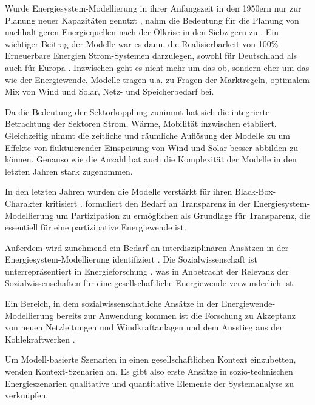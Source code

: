\documentclass[a4paper,11pt,twoside]{scrartcl}
\begin{document}
Wurde Energiesystem-Modellierung in ihrer Anfangszeit in den 1950ern nur zur Planung neuer Kapazitäten genutzt \cite{Kagiannas2004}, nahm die Bedeutung für die Planung von nachhaltigeren Energiequellen nach der Ölkrise in den Siebzigern zu \cite{Wei2006}. Ein wichtiger Beitrag der Modelle war es dann, die Realisierbarkeit von 100\% Erneuerbare Energien Strom-Systemen darzulegen, sowohl für Deutschland \cite{SRU2011} als auch für Europa \cite{Hohmeyer2015}. Inzwischen geht es nicht mehr um das ob, sondern eher um das wie der Energiewende. Modelle tragen u.a. zu Fragen der Marktregeln, optimalem Mix von Wind und Solar, Netz- und Speicherbedarf bei.  

Da die Bedeutung der Sektorkopplung zunimmt \cite{Quaschning2016} hat sich die integrierte Betrachtung der Sektoren Strom, Wärme, Mobilität inzwischen etabliert. Gleichzeitig nimmt die zeitliche und räumliche Auflösung der Modelle zu um Effekte von fluktuierender Einspeisung von Wind und Solar besser abbilden zu können. Genauso wie die Anzahl hat auch die Komplexität der Modelle in den letzten Jahren stark zugenommen.

In den letzten Jahren wurden die Modelle verstärkt für ihren Black-Box-Charakter kritisiert \cite{Pfenninger2017, Pfenninger2017b,Cao2016}. \cite{Wiese2015} formuliert den Bedarf an Transparenz in der Energiesystem-Modellierung um Partizipation zu ermöglichen \cite{Wiese2014} als Grundlage für Transparenz, die essentiell für eine partizipative Energiewende ist.

Außerdem wird zunehmend ein Bedarf an interdisziplinären Ansätzen in der Energiesystem-Modellierung identifiziert \cite{Wiese2018,Pfenninger2014,Schuitema2017}. Die Sozialwissenschaft ist unterrepräsentiert in Energieforschung \cite{Sovacool2014}, was in Anbetracht der Relevanz der Sozialwissenschaften für eine gesellschaftliche Energiewende \cite{Sovacool2015} verwunderlich ist.

Ein Bereich, in dem sozialwissenschatliche Ansätze in der Energiewende-Modellierung bereits zur Anwendung kommen ist die Forschung zu Akzeptanz von neuen Netzleitungen und Windkraftanlagen \cite{vernetzen2016} und dem Ausstieg aus der Kohlekraftwerken \cite{Heinrichs2017}.

Um Modell-basierte Szenarien in einen gesellschaftlichen Kontext einzubetten, wenden \cite{WEIMERJEHLE2016} Kontext-Szenarien \cite{WEIMERJEHLE2006} an. Es gibt also erste Ansätze in  sozio-technischen Energieszenarien qualitative und quantitative Elemente der Systemanalyse zu verknüpfen.
\end{document}
